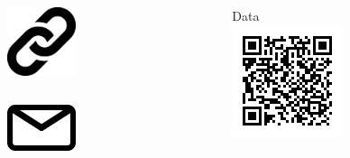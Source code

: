 \begin{columns}[c]
	\begin{column}{0.65\textwidth}
		\begin{columns}[c]
			\begin{column}{0.2\textwidth}
				\begin{figure}[h]
					\includegraphics[width=2cm]{icons/url.pdf}
				\end{figure}
			\end{column}
			\begin{column}{0.8\textwidth}
				\large{
					\color{boxbkseablue}
					\textbf{\getUrlList}
				}
			\end{column}
		\end{columns}
		\vskip0.5cm
		\begin{columns}[c]
			\begin{column}{0.2\textwidth}
				\begin{figure}[h]
					\includegraphics[width=2cm]{icons/mail.pdf}
				\end{figure}
			\end{column}
			\begin{column}{0.8\textwidth}
				\large{ 
					\color{boxbkseablue}
					\textbf{\getContactsList}
				}
			\end{column}
		\end{columns}
	\end{column}
	\begin{column}{0.35\textwidth}
		\begin{figure}[h]
			{\Large Data~\textdownarrow}\\ \vskip0.3cm
			\includegraphics[width=0.6\columnwidth]{docs/imgs/poc.png}
		\end{figure}
	\vskip0.5cm
	\end{column}
\end{columns}
